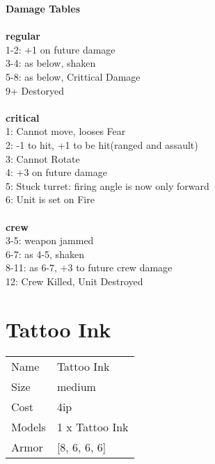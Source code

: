 {\bf Damage Tables} \\
\ \\ {\bf regular } \\
1-2: +1 on future damage \\
3-4: as below, shaken \\
5-8: as below, Crittical Damage \\
9+ Destoryed \\
\ \\ {\bf critical } \\
1: Cannot move, looses Fear \\
2: -1 to hit, +1 to be hit(ranged and assault) \\
3: Cannot Rotate \\
4: +3 on future damage \\
5: Stuck turret: firing angle is now only forward \\
6: Unit is set on Fire \\
\ \\ {\bf crew } \\
3-5: weapon jammed \\
6-7: as 4-5, shaken \\
8-11: as 6-7, +3 to future crew damage \\
12: Crew Killed, Unit Destroyed \\










\pagebreak\pagebreak

\section{ Tattoo Ink }

\begin{tabular}{ll}
  Name & Tattoo Ink \\
  Size & medium\\
  Cost & 4ip\\
  Models & 1 x Tattoo Ink\\
  Armor & [8, 6, 6, 6]\\
\end{tabular}

\noindent 

